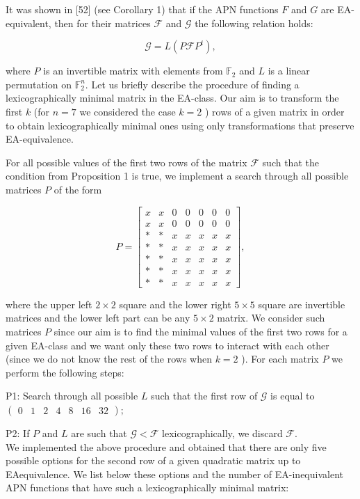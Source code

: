 \documentclass[10pt]{article}
\begin{document}
It was shown in [52] (see Corollary 1) that if the APN functions $F$ and $G$ are EA-equivalent, then for their matrices $\mathcal{F}$ and $\mathcal{G}$ the following relation holds:

$$
\mathcal{G}=L\left(P \mathcal{F} P^{t}\right),
$$

where $P$ is an invertible matrix with elements from $\mathbb{F}_{2}$ and $L$ is a linear permutation on $\mathbb{F}_{2}^{n}$. Let us briefly describe the procedure of finding a lexicographically minimal matrix in the EA-class. Our aim is to transform the first $k$ (for $n=7$ we considered the case $k=2$ ) rows of a given matrix in order to obtain lexicographically minimal ones using only transformations that preserve EA-equivalence.

For all possible values of the first two rows of the matrix $\mathcal{F}$ such that the condition from Proposition 1 is true, we implement a search through all possible matrices $P$ of the form

$$
P=\left[\begin{array}{lllllll}
x & x & 0 & 0 & 0 & 0 & 0 \\
x & x & 0 & 0 & 0 & 0 & 0 \\
* & * & x & x & x & x & x \\
* & * & x & x & x & x & x \\
* & * & x & x & x & x & x \\
* & * & x & x & x & x & x \\
* & * & x & x & x & x & x
\end{array}\right],
$$

where the upper left $2 \times 2$ square and the lower right $5 \times 5$ square are invertible matrices and the lower left part can be any $5 \times 2$ matrix. We consider such matrices $P$ since our aim is to find the minimal values of the first two rows for a given EA-class and we want only these two rows to interact with each other (since we do not know the rest of the rows when $k=2$ ). For each matrix $P$ we perform the following steps:

P1: Search through all possible $L$ such that the first row of $\mathcal{G}$ is equal to $\left(\begin{array}{lllllll}0 & 1 & 2 & 4 & 8 & 16 & 32\end{array}\right) ;$

P2: If $P$ and $L$ are such that $\mathcal{G}<\mathcal{F}$ lexicographically, we discard $\mathcal{F}$.\\
We implemented the above procedure and obtained that there are only five possible options for the second row of a given quadratic matrix up to EAequivalence. We list below these options and the number of EA-inequivalent APN functions that have such a lexicographically minimal matrix:
\end{document}
